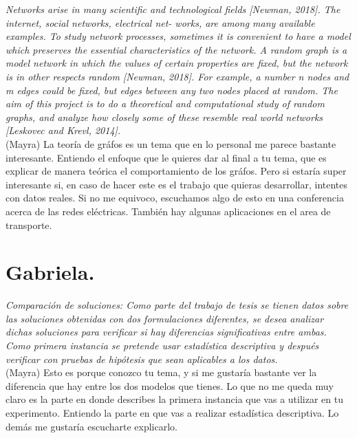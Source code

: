 \documentclass{article}
\begin{document}
\textit{Networks arise in many scientific and technological fields [Newman, 2018]. The internet, social networks, electrical net- works, are among many available examples. To study network processes, sometimes it is convenient to have a model which preserves the essential characteristics of the network. A random graph is a model network in which the values of certain properties are fixed, but the network is in other respects random [Newman, 2018]. For example, a number n nodes and m edges could be fixed, but edges between any two nodes placed at random. The aim of this project is to do a theoretical and computational study of random graphs, and analyze how closely some of these resemble real world networks [Leskovec and Krevl, 2014].}\\

(Mayra) La teor\'ia de gr\'afos es un tema que en lo personal me parece bastante interesante. Entiendo el enfoque que le quieres dar al final a tu tema, que es explicar de manera te\'orica el comportamiento de los gr\'afos. Pero si estar\'ia super interesante si, en caso de hacer este es el trabajo que quieras desarrollar, intentes con datos reales. Si no me equivoco, escuchamos algo de esto en una conferencia acerca de las redes el\'ectricas. Tambi\'en hay algunas aplicaciones en el area de transporte.\\




\section{Gabriela.}

\textit{Comparación de soluciones: Como parte del trabajo de tesis se tienen datos sobre las soluciones obtenidas con dos formulaciones diferentes, se desea analizar dichas soluciones para verificar si hay diferencias significativas entre ambas. Como primera instancia se pretende usar estad\'istica descriptiva y despu\'es verificar con pruebas de hip\'otesis que sean aplicables
a los datos.}\\

(Mayra) Esto es porque conozco tu tema, y si me gustar\'ia bastante ver la diferencia que hay entre los dos modelos que tienes. Lo que no me queda muy claro es la parte en donde describes la primera instancia que vas a utilizar en tu experimento. Entiendo la parte en que vas a realizar estad\'istica descriptiva. Lo dem\'as me gustar\'ia escucharte explicarlo.\\



 
\end{document}

